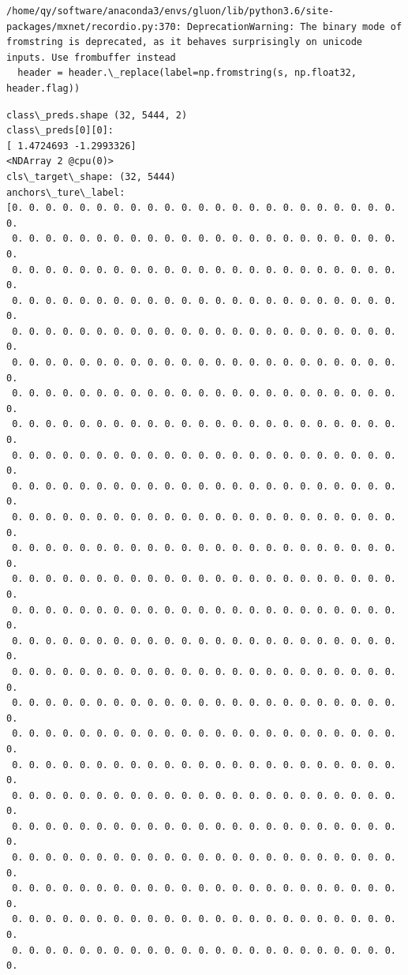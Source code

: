 \documentclass[11pt]{article}
\begin{document}
    \begin{Verbatim}[commandchars=\\\{\}]
/home/qy/software/anaconda3/envs/gluon/lib/python3.6/site-packages/mxnet/recordio.py:370: DeprecationWarning: The binary mode of fromstring is deprecated, as it behaves surprisingly on unicode inputs. Use frombuffer instead
  header = header.\_replace(label=np.fromstring(s, np.float32, header.flag))

    \end{Verbatim}

    \begin{Verbatim}[commandchars=\\\{\}]
class\_preds.shape (32, 5444, 2)
class\_preds[0][0]: 
[ 1.4724693 -1.2993326]
<NDArray 2 @cpu(0)>
cls\_target\_shape: (32, 5444)
anchors\_ture\_label: 
[0. 0. 0. 0. 0. 0. 0. 0. 0. 0. 0. 0. 0. 0. 0. 0. 0. 0. 0. 0. 0. 0. 0. 0.
 0. 0. 0. 0. 0. 0. 0. 0. 0. 0. 0. 0. 0. 0. 0. 0. 0. 0. 0. 0. 0. 0. 0. 0.
 0. 0. 0. 0. 0. 0. 0. 0. 0. 0. 0. 0. 0. 0. 0. 0. 0. 0. 0. 0. 0. 0. 0. 0.
 0. 0. 0. 0. 0. 0. 0. 0. 0. 0. 0. 0. 0. 0. 0. 0. 0. 0. 0. 0. 0. 0. 0. 0.
 0. 0. 0. 0. 0. 0. 0. 0. 0. 0. 0. 0. 0. 0. 0. 0. 0. 0. 0. 0. 0. 0. 0. 0.
 0. 0. 0. 0. 0. 0. 0. 0. 0. 0. 0. 0. 0. 0. 0. 0. 0. 0. 0. 0. 0. 0. 0. 0.
 0. 0. 0. 0. 0. 0. 0. 0. 0. 0. 0. 0. 0. 0. 0. 0. 0. 0. 0. 0. 0. 0. 0. 0.
 0. 0. 0. 0. 0. 0. 0. 0. 0. 0. 0. 0. 0. 0. 0. 0. 0. 0. 0. 0. 0. 0. 0. 0.
 0. 0. 0. 0. 0. 0. 0. 0. 0. 0. 0. 0. 0. 0. 0. 0. 0. 0. 0. 0. 0. 0. 0. 0.
 0. 0. 0. 0. 0. 0. 0. 0. 0. 0. 0. 0. 0. 0. 0. 0. 0. 0. 0. 0. 0. 0. 0. 0.
 0. 0. 0. 0. 0. 0. 0. 0. 0. 0. 0. 0. 0. 0. 0. 0. 0. 0. 0. 0. 0. 0. 0. 0.
 0. 0. 0. 0. 0. 0. 0. 0. 0. 0. 0. 0. 0. 0. 0. 0. 0. 0. 0. 0. 0. 0. 0. 0.
 0. 0. 0. 0. 0. 0. 0. 0. 0. 0. 0. 0. 0. 0. 0. 0. 0. 0. 0. 0. 0. 0. 0. 0.
 0. 0. 0. 0. 0. 0. 0. 0. 0. 0. 0. 0. 0. 0. 0. 0. 0. 0. 0. 0. 0. 0. 0. 0.
 0. 0. 0. 0. 0. 0. 0. 0. 0. 0. 0. 0. 0. 0. 0. 0. 0. 0. 0. 0. 0. 0. 0. 0.
 0. 0. 0. 0. 0. 0. 0. 0. 0. 0. 0. 0. 0. 0. 0. 0. 0. 0. 0. 0. 0. 0. 0. 0.
 0. 0. 0. 0. 0. 0. 0. 0. 0. 0. 0. 0. 0. 0. 0. 0. 0. 0. 0. 0. 0. 0. 0. 0.
 0. 0. 0. 0. 0. 0. 0. 0. 0. 0. 0. 0. 0. 0. 0. 0. 0. 0. 0. 0. 0. 0. 0. 0.
 0. 0. 0. 0. 0. 0. 0. 0. 0. 0. 0. 0. 0. 0. 0. 0. 0. 0. 0. 0. 0. 0. 0. 0.
 0. 0. 0. 0. 0. 0. 0. 0. 0. 0. 0. 0. 0. 0. 0. 0. 0. 0. 0. 0. 0. 0. 0. 0.
 0. 0. 0. 0. 0. 0. 0. 0. 0. 0. 0. 0. 0. 0. 0. 0. 0. 0. 0. 0. 0. 0. 0. 0.
 0. 0. 0. 0. 0. 0. 0. 0. 0. 0. 0. 0. 0. 0. 0. 0. 0. 0. 0. 0. 0. 0. 0. 0.
 0. 0. 0. 0. 0. 0. 0. 0. 0. 0. 0. 0. 0. 0. 0. 0. 0. 0. 0. 0. 0. 0. 0. 0.
 0. 0. 0. 0. 0. 0. 0. 0. 0. 0. 0. 0. 0. 0. 0. 0. 0. 0. 0. 0. 0. 0. 0. 0.
 0. 0. 0. 0. 0. 0. 0. 0. 0. 0. 0. 0. 0. 0. 0. 0. 0. 0. 0. 0. 0. 0. 0. 0.

\end{Verbatim}
\end{document}
